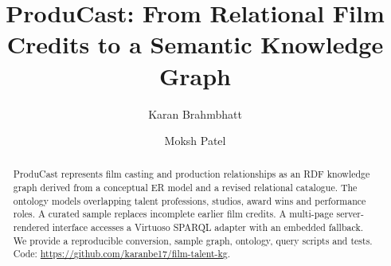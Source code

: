 \documentclass[sigconf,nonacm]{acmart}
\begin{document}
\title{ProduCast: From Relational Film Credits to a Semantic Knowledge Graph}
\author{Karan Brahmbhatt}
\author{Moksh Patel}
\begin{abstract}
ProduCast represents film casting and production relationships as an RDF knowledge graph derived from a conceptual ER model and a revised relational catalogue. The ontology models overlapping talent professions, studios, award wins and performance roles. A curated sample replaces incomplete earlier film credits. A multi-page server-rendered interface accesses a Virtuoso SPARQL adapter with an embedded fallback. We provide a reproducible conversion, sample graph, ontology, query scripts and tests. Code: \url{https://github.com/karanbe17/film-talent-kg}.
\end{abstract}
\maketitle
\end{document}
